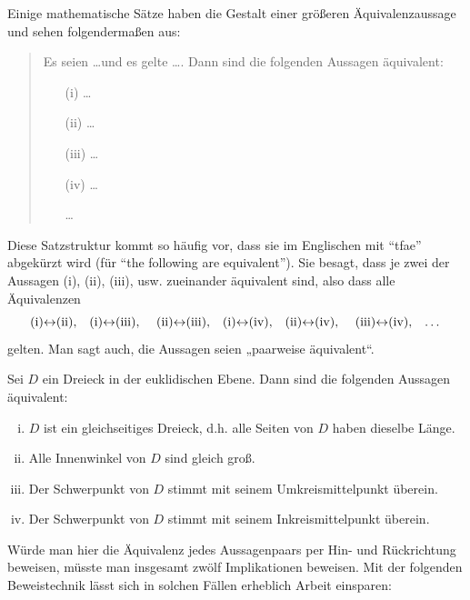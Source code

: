 \begin{defin} \label{def:tfae}
    Einige mathematische Sätze haben die Gestalt einer größeren Äquivalenzaussage und sehen folgendermaßen aus:
    \begin{quote}
        Es seien \dots und es gelte \dots. Dann sind die folgenden Aussagen äquivalent:
        \begin{itemize}
            \item[(i)] \dots
            \item[(ii)] \dots
            \item[(iii)] \dots
            \item[(iv)] \dots
            \item[\dots]
        \end{itemize}
    \end{quote}
    Diese Satzstruktur kommt so häufig vor, dass sie im Englischen mit ``tfae'' abgekürzt wird (für ``the following are equivalent''). Sie besagt, dass je zwei der Aussagen (i), (ii), (iii), usw. zueinander äquivalent sind, also dass alle Äquivalenzen
        \[ \text{(i)$\leftrightarrow$(ii),\quad (i)$\leftrightarrow$(iii), \quad (ii)$\leftrightarrow$(iii),\quad (i)$\leftrightarrow$(iv),\quad (ii)$\leftrightarrow$(iv), \quad (iii)$\leftrightarrow$(iv),\quad \dots} \]
    gelten. Man sagt auch, die Aussagen seien „paarweise äquivalent“.
 \end{defin}
 
 
\begin{bsp}
    Sei $D$ ein Dreieck in der euklidischen Ebene. Dann sind die folgenden Aussagen äquivalent:
    \begin{enumerate}[(i)]
        \item $D$ ist ein gleichseitiges Dreieck, d.h. alle Seiten von $D$ haben dieselbe Länge.
        \item Alle Innenwinkel von $D$ sind gleich groß.
        \item Der Schwerpunkt von $D$ stimmt mit seinem Umkreismittelpunkt überein.
        \item Der Schwerpunkt von $D$ stimmt mit seinem Inkreismittelpunkt überein.
    \end{enumerate}
Würde man hier die Äquivalenz jedes Aussagenpaars per Hin- und Rückrichtung beweisen, müsste man insgesamt zwölf Implikationen beweisen. Mit der folgenden Beweistechnik lässt sich in solchen Fällen erheblich Arbeit einsparen:
\end{bsp}


